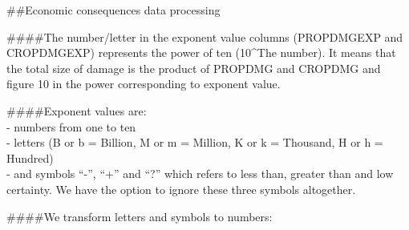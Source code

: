 \documentclass[
]{article}
\begin{document}
\#\#Economic consequences data processing

\#\#\#\#The number/letter in the exponent value columns (PROPDMGEXP and
CROPDMGEXP) represents the power of ten (10\^{}The number). It means
that the total size of damage is the product of PROPDMG and CROPDMG and
figure 10 in the power corresponding to exponent value.

\#\#\#\#Exponent values are:\\
- numbers from one to ten\\
- letters (B or b = Billion, M or m = Million, K or k = Thousand, H or h
= Hundred)\\
- and symbols ``-'', ``+'' and ``?'' which refers to less than, greater
than and low certainty. We have the option to ignore these three symbols
altogether.

\#\#\#\#We transform letters and symbols to numbers:
\end{document}

